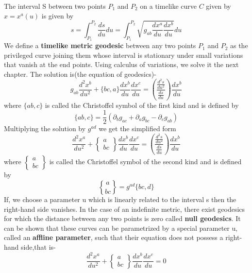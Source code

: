 \documentclass[12pt,a4paper]{article}
\numberwithin{table}{section}
\numberwithin{figure}{section}
\numberwithin{equation}{section}
\theoremstyle{remark}
\theoremstyle{definition}
\DeclareRobustCommand{\stirling}{\genfrac\{\}{0pt}{}}
\begin{document}
The interval S between two points $P_1$ and $P_2$ on a timelike curve $C$ given by $x=x^a(u)$ is given by
$$s=\int^{P_2}_{P_1}\dfrac{ds}{du}du=\int^{P_2}_{P_1}\sqrt{g_{ab}\dfrac{dx^a}{du}\dfrac{dx^b}{du}} du$$
We define a \textbf{timelike metric geodesic} between any two points $P_1$ and $P_2$ as the privileged curve joining them whose interval is stationary under small variations that vanish at the end points. Using calculus of variations, we solve it the next chapter. The solution is(the equation of geodesics)-
$$g_{ab}\dfrac{d^2x^b}{du^2}+\{bc,a\}\dfrac{dx^b}{du}\dfrac{dx^c}{du}=\left(\dfrac{\frac{d^2s}{du^2}}{\frac{ds}{du}}\right)\dfrac{dx^b}{du} $$
where $\{ab,c\} $ is called the Christoffel symbol of 
the first kind and is defined by
$$\{ab,c\}=\frac{1}{2}(\partial_bg_{ac}+\partial_ag_{bc}-\partial_cg_{ab})$$
Multiplying the solution by $g^{ad}$ we get the simplified form
$$\dfrac{d^2x^a}{du^2}+\begin{Bmatrix}a\\bc\end{Bmatrix} \dfrac{dx^b}{du}\dfrac{dx^c}{du}=\left(\dfrac{\frac{d^2s}{du^2}}{\frac{ds}{du}}\right)\dfrac{dx^b}{du}$$
where $\begin{Bmatrix}a\\bc\end{Bmatrix}$ is called the Christoffel symbol of 
the second kind and is defined by
$$\stirling{a}{bc}=g^{ad}\{bc,d\} $$
If, we choose a parameter u which is linearly related to the interval s then the right-hand side vanishes. In the case of an indefinite metric, there exist geodesics for which the distance between any two points is zero called \textbf{null geodesics}. It can be shown that these curves can be parametrized by a special parameter u, called an \textbf{affline parameter}, such that their equation does not possess a right-hand side,that is-
$$\dfrac{d^2x^a}{du^2}+\begin{Bmatrix}a\\bc\end{Bmatrix} \dfrac{dx^b}{du}\dfrac{dx^c}{du}=0 $$
\end{document}
